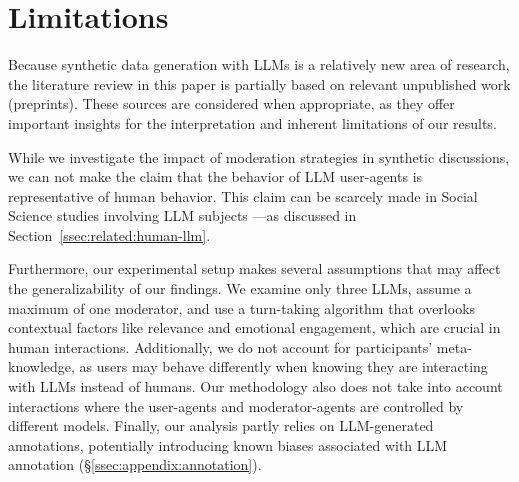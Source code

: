 %
\section{Limitations} 
\label{sec:limitations}

Because synthetic data generation with \acp{LLM} is a relatively new area of research, the literature review in this paper is partially based on relevant unpublished work (preprints). These sources are considered when appropriate, as they offer important insights for the interpretation and inherent limitations of our results.

While we investigate the impact of moderation strategies in synthetic discussions, we can not make the claim that the behavior of \ac{LLM} user-agents is representative of human behavior. This claim can be scarcely made in Social Science studies involving \ac{LLM} subjects \cite{rossi_2024, zhou-etal-2024-real}—as discussed in Section~\ref{ssec:related:human-llm}.

Furthermore, our experimental setup makes several assumptions that may affect the generalizability of our findings. We examine only three \acp{LLM}, assume a maximum of one moderator, and use a turn-taking algorithm that overlooks contextual factors like relevance and emotional engagement, which are crucial in human interactions. Additionally, we do not account for participants' meta-knowledge, as users may behave differently when knowing they are interacting with \acp{LLM} instead of humans. Our methodology also does not take into account interactions where the user-agents and moderator-agents are controlled by different models. Finally, our analysis partly relies on \ac{LLM}-generated annotations, potentially introducing known biases associated with \ac{LLM} annotation (\S\ref{ssec:appendix:annotation}).